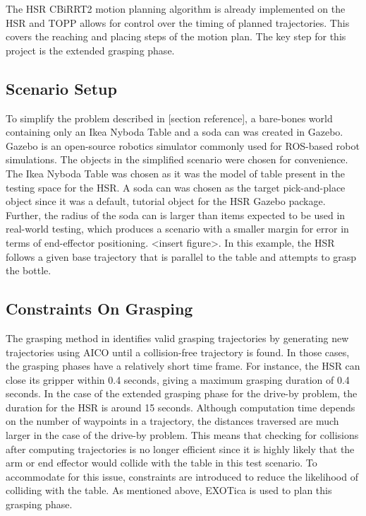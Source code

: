 \documentclass[12pt]{article}
\begin{document}
            The HSR CBiRRT2 motion planning algorithm is already implemented on the HSR and TOPP allows for control over the timing of planned trajectories. This covers the reaching and placing steps of the motion plan. The key step for this project is the extended grasping phase.

        \subsection{Scenario Setup}
            To simplify the problem described in [section reference], a bare-bones world containing only an Ikea Nyboda Table and a soda can was created in Gazebo. Gazebo is an open-source robotics simulator commonly used for ROS-based robot simulations. The objects in the simplified scenario were chosen for convenience. The Ikea Nyboda Table was chosen as it was the model of table present in the testing space for the HSR. A soda can was chosen as the target pick-and-place object since it was a default, tutorial object for the HSR Gazebo package. Further, the radius of the soda can is larger than items expected to be used in real-world testing, which produces a scenario with a smaller margin for error in terms of end-effector positioning. <insert figure>. In this example, the HSR follows a given base trajectory that is parallel to the table and attempts to grasp the bottle.
            
        \subsection{Constraints On Grasping}
            The grasping method in \cite{yang_planning_2018} identifies valid grasping trajectories by generating new trajectories using AICO until a collision-free trajectory is found. In those cases, the grasping phases have a relatively short time frame. For instance, the HSR can close its gripper within 0.4 seconds, giving a maximum grasping duration of 0.4 seconds. In the case of the extended grasping phase for the drive-by problem, the duration for the HSR is around 15 seconds. Although computation time depends on the number of waypoints in a trajectory, the distances traversed are much larger in the case of the drive-by problem. This means that checking for collisions after computing trajectories is no longer efficient since it is highly likely that the arm or end effector would collide with the table in this test scenario. To accommodate for this issue, constraints are introduced to reduce the likelihood of colliding with the table. As mentioned above, EXOTica is used to plan this grasping phase.
\end{document}
